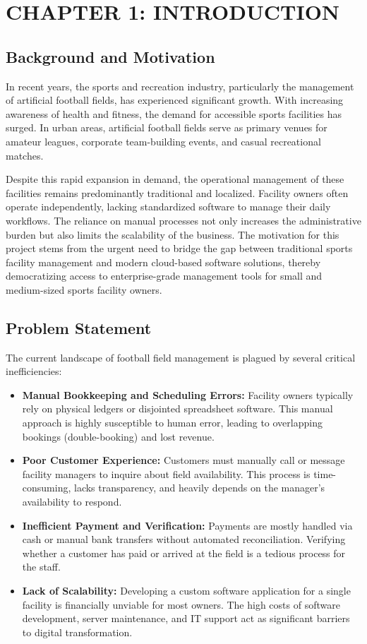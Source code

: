 \section*{CHAPTER 1: INTRODUCTION}
\setcounter{section}{1}
\setcounter{subsection}{0}
\setcounter{figure}{0}
\setcounter{table}{0}

\subsection{Background and Motivation}
In recent years, the sports and recreation industry, particularly the management of artificial football fields, has experienced significant growth. With increasing awareness of health and fitness, the demand for accessible sports facilities has surged. In urban areas, artificial football fields serve as primary venues for amateur leagues, corporate team-building events, and casual recreational matches. 

Despite this rapid expansion in demand, the operational management of these facilities remains predominantly traditional and localized. Facility owners often operate independently, lacking standardized software to manage their daily workflows. The reliance on manual processes not only increases the administrative burden but also limits the scalability of the business. The motivation for this project stems from the urgent need to bridge the gap between traditional sports facility management and modern cloud-based software solutions, thereby democratizing access to enterprise-grade management tools for small and medium-sized sports facility owners.

\subsection{Problem Statement}
The current landscape of football field management is plagued by several critical inefficiencies:
\begin{itemize}
    \item \textbf{Manual Bookkeeping and Scheduling Errors:} Facility owners typically rely on physical ledgers or disjointed spreadsheet software. This manual approach is highly susceptible to human error, leading to overlapping bookings (double-booking) and lost revenue.
    \item \textbf{Poor Customer Experience:} Customers must manually call or message facility managers to inquire about field availability. This process is time-consuming, lacks transparency, and heavily depends on the manager's availability to respond.
    \item \textbf{Inefficient Payment and Verification:} Payments are mostly handled via cash or manual bank transfers without automated reconciliation. Verifying whether a customer has paid or arrived at the field is a tedious process for the staff.
    \item \textbf{Lack of Scalability:} Developing a custom software application for a single facility is financially unviable for most owners. The high costs of software development, server maintenance, and IT support act as significant barriers to digital transformation.
\end{itemize}

